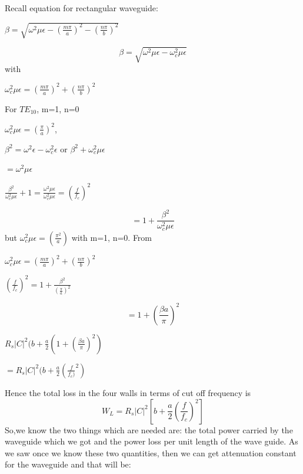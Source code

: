 Recall equation for rectangular waveguide:  
\begin{center}
$\beta=\sqrt{{\omega}^2\mu\epsilon-(\frac{m\pi}{a})^2-(\frac{n\pi}{b})^2}$	
\end{center}
\begin{equation}
\beta = \sqrt{\omega^{2} \mu\epsilon-\omega_c^{2} \mu\epsilon}
\end{equation}
with
\begin{center}
$\omega_c^2\mu\epsilon=(\frac{m\pi}{a})^2+(\frac{n\pi}{b})^2$	
\end{center}
For $TE_{10}$, m=1, n=0
\begin{center}
$\omega_c^2\mu\epsilon=(\frac{\pi}{a})^2$,	
\end{center}
\begin{center}
$\beta^2=\omega^2\epsilon-\omega_c^2\epsilon$  or  $\beta^2 + \omega_c^2\mu\epsilon$	
\end{center}
\begin{center}
$= \omega^2\mu\epsilon$	
\end{center}
\begin{center}
$\frac{\beta^2}{\omega_c^2\mu\epsilon}+1=\frac{\omega^2\mu\epsilon}{\omega_c^2\mu\epsilon}=(\frac{f}{f_c})^2$	
\end{center}
\begin{equation}
= 1+ \frac{\beta^2}{\omega_c^2\mu\epsilon}	
\end{equation}
but $\omega_c^2\mu\epsilon=(\frac{\pi^2}{a})$  with  m=1, n=0. From 
\begin{center}
$\omega_c^2\mu\epsilon=(\frac{m\pi}{a})^2 + (\frac{n\pi}{b})^2$	
\end{center}
\begin{center}
$(\frac{f}{f_c})^2= 1+\frac{\beta^2}{(\frac{\pi}{a})^2}$	
\end{center}
\begin{equation}
=1+ (\frac{\beta a}{\pi})^2	
\end{equation}
\begin{center}
$R_s|C|^2 (b+\frac{a}{2}(1+(\frac{\beta a}{\pi})^2)$	
\end{center}
\begin{center}
$=R_s|C|^2(b+\frac{a}{2}(\frac{f}{f_c)}^2)$	
\end{center}
Hence the total loss in the four walls in terms of cut off frequency is
\begin{equation}
W_L=R_s|C|^2[b+\frac{a}{2}(\frac{f}{f_c})^2]	
\end{equation}
So,we know the two things which are needed are: the total power carried by the waveguide which we got and the power loss per unit length of the wave guide. As we saw once we know these two quantities, then we can get attenuation  constant for the waveguide and that will be:
